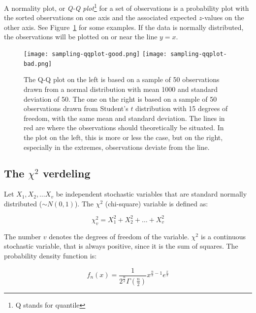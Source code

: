 \begin{definition}
  \label{def:qq-plot}
  A normality plot, or \emph{Q-Q plot}\footnote{Q stands for quantile} for a set of observations is a probability plot with the sorted observations on one axis and the associated expected $z$-values on the other axis. See Figure~\ref{fig:qqplot} for some examples. If the data is normally distributed, the observations will be plotted on or near the line $y = x$.
\end{definition}

\begin{figure}
  
  \begin{center}
  \texttt{[image: sampling-qqplot-good.png]}
  \texttt{[image: sampling-qqplot-bad.png]}
  \end{center}
  \caption{The Q-Q plot on the left is based on a sample of 50 observations drawn from a normal distribution with mean 1000 and standard deviation of 50. The one on the right is based on a sample of 50 observations drawn from Student's $t$ distribution with 15 degrees of freedom, with the same mean and standard deviation. The lines in red are where the observations should theoretically be situated. In the plot on the left, this is more or less the case, but on the right, especially in the extremes, observations deviate from the line.}
  \label{fig:qqplot}
\end{figure}

\subsection[The chi-square distribution]{The $\chi^{2}$ verdeling}
\label{ssec:chi-square-distribution}

Let $X_{1}, X_{2}, \dots X_{v}$ be independent stochastic variables that are standard normally distributed ($\sim N(0,1)$). The $\chi^{2}$ (chi-square) variable is defined as:

\begin{equation}
  \chi^{2}_{v} = X_{1}^{2} + X_{2}^{2} + \dots + X_{v}^{2} 
\end{equation}

The number $v$ denotes the degrees of freedom of the variable. $\chi^{2}$ is a continuous stochastic variable, that is always positive, since it is the sum of squares. The probability density function is:

\[ f_{n}(x) = \frac{1}{2^{\frac{n}{2}}\Gamma(\frac{n}{2})} x^{\frac{n}{2} -1} e^{\frac{x}{2}} \]


